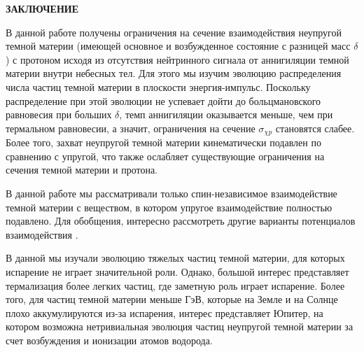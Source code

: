 \newpage
\begin{center}
	\textbf{\large ЗАКЛЮЧЕНИЕ}
\end{center}


В данной работе получены ограничения на сечение взаимодействия неупругой темной материи (имеющей основное и возбужденное состояние с разницей масс $\delta$) с протоном исходя из отсутствия нейтринного сигнала от аннигиляции темной материи внутри небесных тел.
Для этого мы изучим эволюцию распределения числа частиц темной материи в плоскости энергия-импульс. Поскольку распределение при этой эволюции не успевает дойти до больцмановского равновесия при больших $\delta$, темп аннигиляции оказывается меньше, чем при термальном равновесии, а значит, ограничения на сечение $\sigma_{\chi p}$  становятся слабее. Более того, захват неупругой темной материи кинематически подавлен по сравнению с упругой, что также ослабляет существующие ограничения на сечения темной материи и протона.

В данной работе мы рассматривали только спин-независимое взаимодействие темной материи с веществом, в котором упругое взаимодействие полностью подавлено. Для обобщения, интересно рассмотреть другие варианты потенциалов взаимодействия \cite{Fitzpatrick_2013}.

В данной мы изучали эволюцию тяжелых частиц темной материи, для которых испарение не играет значительной роли. Однако, большой интерес представляет термализация более легких частиц, где заметную роль играет испарение. Более того, для частиц темной материи меньше ГэВ, которые на Земле и на Солнце плохо аккумулируются из-за испарения, интерес представляет Юпитер, на котором возможна нетривиальная эволюция частиц неупругой темной материи за счет возбуждения и ионизации атомов водорода.
